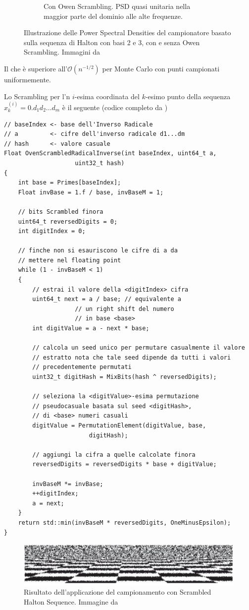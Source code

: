 \begin{figure}[tb]
\begin{subfigure}[t]{0.5\linewidth}
		\caption{Con Owen Scrambling. PSD quasi unitaria nella maggior parte del dominio alle alte frequenze.}
		\label{chapter5:sampling:owen:yes}
	\end{subfigure}
	\caption{Illustrazione delle Power Spectral Densities del campionatore basato sulla sequenza di Halton con basi 2 e 3, con e senza Owen Scrambling.
		Immagini da \cite{pharr}}
	\label{chapter5:sampling:owen}
\end{figure}
Il che \`e superiore all'$\mathcal{O}(n^{-1/2})$ per Monte Carlo con punti campionati uniformemente.\par
Lo Scrambling per l'n $i$-esima coordinata del $k$-esimo punto della sequenza $x_k^{(i)}=0.d_1d_2\ldots d_m$ \`e il seguente 
(codice completo da \cite{pharr})
\begin{verbatim}
// baseIndex <- base dell'Inverso Radicale
// a         <- cifre dell'inverso radicale d1...dm
// hash      <- valore casuale
Float OvenScrambledRadicalInverse(int baseIndex, uint64_t a, 
					uint32_t hash)
{
	int base = Primes[baseIndex];
	Float invBase = 1.f / base, invBaseM = 1;

	// bits Scrambled finora
	uint64_t reversedDigits = 0;
	int digitIndex = 0;

	// finche non si esauriscono le cifre di a da 
	// mettere nel floating point
	while (1 - invBaseM < 1)
	{
		// estrai il valore della <digitIndex> cifra
		uint64_t next = a / base; // equivalente a 
					// un right shift del numero
					// in base <base>
		int digitValue = a - next * base;

		// calcola un seed unico per permutare casualmente il valore 
		// estratto nota che tale seed dipende da tutti i valori 
		// precedentemente permutati
		uint32_t digitHash = MixBits(hash ^ reversedDigits);

		// seleziona la <digitValue>-esima permutazione 
		// pseudocasuale basata sul seed <digitHash>, 
		// di <base> numeri casuali
		digitValue = PermutationElement(digitValue, base, 
						digitHash);

		// aggiungi la cifra a quelle calcolate finora
		reversedDigits = reversedDigits * base + digitValue;

		invBaseM *= invBase;
		++digitIndex;
		a = next;
	}
	return std::min(invBaseM * reversedDigits, OneMinusEpsilon);
}
\end{verbatim}
\begin{figure}[b]
	\centering
	\includegraphics[width=\linewidth]{../assets/chapter5_sampling_result.png}
	\caption{Risultato dell'applicazione del campionamento con Scrambled Halton Sequence. Immagine da \cite{pharr}}
	\label{chapter5:sampling:result}
\end{figure}
